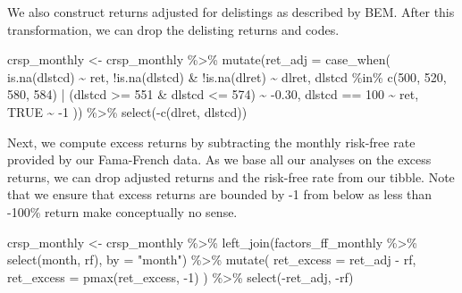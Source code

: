 \documentclass[
]{krantz}
\newenvironment{Shaded}{\begin{snugshade}}{\end{snugshade}}
\newcommand{\AttributeTok}[1]{\textcolor[rgb]{0.61,0.61,0.61}{#1}}
\newcommand{\ConstantTok}[1]{\textcolor[rgb]{0,0,0}{#1}}
\newcommand{\DecValTok}[1]{\textcolor[rgb]{0.06,0.06,0.06}{#1}}
\newcommand{\FloatTok}[1]{\textcolor[rgb]{0.06,0.06,0.06}{#1}}
\newcommand{\FunctionTok}[1]{\textcolor[rgb]{0,0,0}{#1}}
\newcommand{\NormalTok}[1]{#1}
\newcommand{\OtherTok}[1]{\textcolor[rgb]{0.37,0.37,0.37}{#1}}
\newcommand{\SpecialCharTok}[1]{\textcolor[rgb]{0,0,0}{#1}}
\newcommand{\StringTok}[1]{\textcolor[rgb]{0.5,0.5,0.5}{#1}}
\begin{document}
We also construct returns adjusted for delistings as described by BEM. After this transformation, we can drop the delisting returns and codes.

\begin{Shaded}
\begin{Highlighting}[]
\NormalTok{crsp\_monthly }\OtherTok{\textless{}{-}}\NormalTok{ crsp\_monthly }\SpecialCharTok{\%\textgreater{}\%}
  \FunctionTok{mutate}\NormalTok{(}\AttributeTok{ret\_adj =} \FunctionTok{case\_when}\NormalTok{(}
    \FunctionTok{is.na}\NormalTok{(dlstcd) }\SpecialCharTok{\textasciitilde{}}\NormalTok{ ret,}
    \SpecialCharTok{!}\FunctionTok{is.na}\NormalTok{(dlstcd) }\SpecialCharTok{\&} \SpecialCharTok{!}\FunctionTok{is.na}\NormalTok{(dlret) }\SpecialCharTok{\textasciitilde{}}\NormalTok{ dlret,}
\NormalTok{    dlstcd }\SpecialCharTok{\%in\%} \FunctionTok{c}\NormalTok{(}\DecValTok{500}\NormalTok{, }\DecValTok{520}\NormalTok{, }\DecValTok{580}\NormalTok{, }\DecValTok{584}\NormalTok{) }\SpecialCharTok{|}
\NormalTok{      (dlstcd }\SpecialCharTok{\textgreater{}=} \DecValTok{551} \SpecialCharTok{\&}\NormalTok{ dlstcd }\SpecialCharTok{\textless{}=} \DecValTok{574}\NormalTok{) }\SpecialCharTok{\textasciitilde{}} \SpecialCharTok{{-}}\FloatTok{0.30}\NormalTok{,}
\NormalTok{    dlstcd }\SpecialCharTok{==} \DecValTok{100} \SpecialCharTok{\textasciitilde{}}\NormalTok{ ret,}
    \ConstantTok{TRUE} \SpecialCharTok{\textasciitilde{}} \SpecialCharTok{{-}}\DecValTok{1}
\NormalTok{  )) }\SpecialCharTok{\%\textgreater{}\%}
  \FunctionTok{select}\NormalTok{(}\SpecialCharTok{{-}}\FunctionTok{c}\NormalTok{(dlret, dlstcd))}
\end{Highlighting}
\end{Shaded}

Next, we compute excess returns by subtracting the monthly risk-free rate provided by our Fama-French data. As we base all our analyses on the excess returns, we can drop adjusted returns and the risk-free rate from our tibble. Note that we ensure that excess returns are bounded by -1 from below as less than -100\% return make conceptually no sense.

\begin{Shaded}
\begin{Highlighting}[]
\NormalTok{crsp\_monthly }\OtherTok{\textless{}{-}}\NormalTok{ crsp\_monthly }\SpecialCharTok{\%\textgreater{}\%}
  \FunctionTok{left\_join}\NormalTok{(factors\_ff\_monthly }\SpecialCharTok{\%\textgreater{}\%} \FunctionTok{select}\NormalTok{(month, rf), }\AttributeTok{by =} \StringTok{"month"}\NormalTok{) }\SpecialCharTok{\%\textgreater{}\%}
  \FunctionTok{mutate}\NormalTok{(}
    \AttributeTok{ret\_excess =}\NormalTok{ ret\_adj }\SpecialCharTok{{-}}\NormalTok{ rf,}
    \AttributeTok{ret\_excess =} \FunctionTok{pmax}\NormalTok{(ret\_excess, }\SpecialCharTok{{-}}\DecValTok{1}\NormalTok{)}
\NormalTok{  ) }\SpecialCharTok{\%\textgreater{}\%}
  \FunctionTok{select}\NormalTok{(}\SpecialCharTok{{-}}\NormalTok{ret\_adj, }\SpecialCharTok{{-}}\NormalTok{rf)}
\end{Highlighting}
\end{Shaded}
\end{document}
